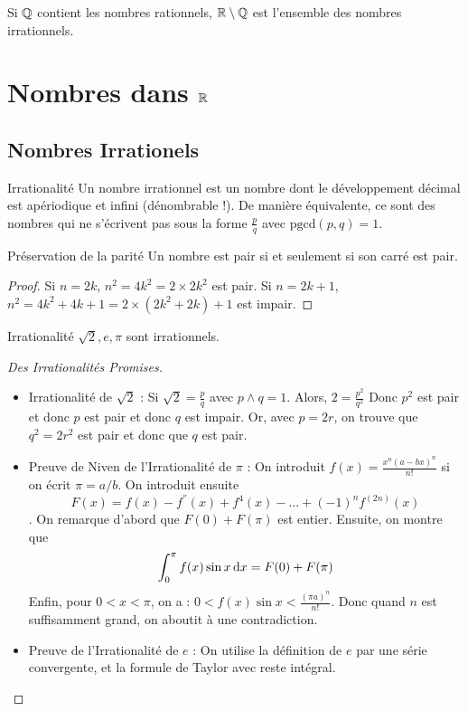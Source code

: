 \documentclass{cours}
\begin{document}
    Si $\mathbb{Q}$ contient les nombres rationnels, $\mathbb{R} \setminus \mathbb{Q}$ est l'ensemble des nombres irrationnels.

    \section{Nombres dans $\mathbb{R}$}
    \subsection{Nombres Irrationels}
    \begin{définition}{Irrationalité}{}
        Un nombre irrationnel est un nombre dont le développement décimal est apériodique et infini (dénombrable !). De manière équivalente, ce sont des nombres qui ne s'écrivent pas sous la forme $\frac{p}{q}$ avec $\text{pgcd}(p, q) = 1$.
    \end{définition}

    
    \begin{lemme}{Préservation de la parité}{}
        Un nombre est pair si et seulement si son carré est pair.
    \end{lemme}
    \begin{proof}
        Si $n = 2k$, $n^{2} = 4k^{2} = 2\times 2k^{2}$ est pair. Si $n = 2k +1$, $n^{2} = 4k^{2} + 4k + 1 = 2\times(2k^{2} + 2k) + 1$ est impair.
    \end{proof}

    \begin{propositionfr}{Irrationalité}{}
        $\sqrt{2}, e, \pi$ sont irrationnels.
    \end{propositionfr}
    
    \begin{proof}[Des Irrationalités Promises]
        \begin{itemize}
            \item Irrationalité de $\sqrt{2}$ : Si $\sqrt{2} = \frac{p}{q}$ avec $p \wedge q = 1$. Alors, $2 = \frac{p^{2}}{q^{2}}$ Donc $p^{2}$ est pair et donc $p$ est pair et donc $q$ est impair. Or, avec $p = 2r$, on trouve que $q^{2} = 2r^{2}$ est pair et donc que $q$ est pair.
            \item Preuve de Niven de l'Irrationalité de $\pi$ : On introduit $f(x) = \frac{x^{n}(a-bx)^{n}}{n!}$ si on écrit $\pi = a/b$. On introduit ensuite \[F(x) = f(x) - f^{''}(x) + f^{4}(x) - \ldots + \left(-1\right)^{n}f^{(2n)}(x)\]. On remarque d'abord que $F(0) + F(\pi)$ est entier. Ensuite, on montre que \[\int_{0}^{\pi}f(x) \sin x {\rm \, d} x = F(0) + F(\pi)\] Enfin, pour $0 < x < \pi$, on a : $0 < f(x)\sin x < \frac{\left(\pi a\right)^{n}}{n!}$. Donc quand $n$ est suffisamment grand, on aboutit à une contradiction. 
            \item Preuve de l'Irrationalité de $e$ : On utilise la définition de $e$ par une série convergente, et la formule de Taylor avec reste intégral. 
        \end{itemize}
    \end{proof}
\end{document}
